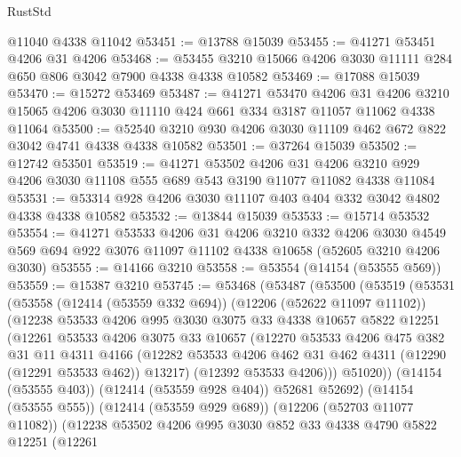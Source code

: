 \begin{lexlean}{RustStd}
\begin{coremodule}
    @11040
    @4338
    @11042
@53451 := @13788 @15039
@53455 := @41271 @53451 @4206 @31 @4206
@53468 := @53455 @3210 @15066 @4206 @3030 @11111 @284 @650 @806 @3042 @7900 @4338 @4338 @10582
@53469 := @17088 @15039
@53470 := @15272 @53469
@53487 := @41271
    @53470
    @4206
    @31
    @4206
    @3210
    @15065
    @4206
    @3030
    @11110
    @424
    @661
    @334
    @3187
    @11057
    @11062
    @4338
    @11064
@53500 := @52540 @3210 @930 @4206 @3030 @11109 @462 @672 @822 @3042 @4741 @4338 @4338 @10582
@53501 := @37264 @15039
@53502 := @12742 @53501
@53519 := @41271
    @53502
    @4206
    @31
    @4206
    @3210
    @929
    @4206
    @3030
    @11108
    @555
    @689
    @543
    @3190
    @11077
    @11082
    @4338
    @11084
@53531 := @53314 @928 @4206 @3030 @11107 @403 @404 @332 @3042 @4802 @4338 @4338 @10582
@53532 := @13844 @15039
@53533 := @15714 @53532
@53554 := @41271
    @53533
    @4206
    @31
    @4206
    @3210
    @332
    @4206
    @3030
    @4549
    @569
    @694
    @922
    @3076
    @11097
    @11102
    @4338
    @10658
    (@52605 @3210 @4206 @3030)
@53555 := @14166 @3210
@53558 := @53554 (@14154 (@53555 @569))
@53559 := @15387 @3210
@53745 := @53468
    (@53487
      (@53500
        (@53519
          (@53531
            (@53558
              (@12414 (@53559 @332 @694))
              (@12206 (@52622 @11097 @11102))
              (@12238
                @53533
                @4206
                @995
                @3030
                @3075
                @33
                @4338
                @10657
                @5822
                @12251
                (@12261
                  @53533
                  @4206
                  @3075
                  @33
                  @10657
                  (@12270
                    @53533
                    @4206
                    @475
                    @382
                    @31
                    @11
                    @4311
                    @4166
                    (@12282 @53533 @4206 @462 @31 @462 @4311 (@12290 (@12291 @53533 @462)) @13217)
                    (@12392 @53533 @4206)))
                @51020))
            (@14154 (@53555 @403))
            (@12414 (@53559 @928 @404))
            @52681
            @52692)
          (@14154 (@53555 @555))
          (@12414 (@53559 @929 @689))
          (@12206 (@52703 @11077 @11082))
          (@12238
            @53502
            @4206
            @995
            @3030
            @852
            @33
            @4338
            @4790
            @5822
            @12251
            (@12261

\end{coremodule}
\end{lexlean}
